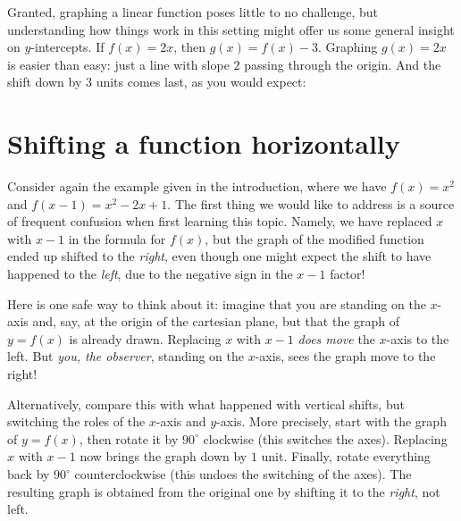 \documentclass{ximera}
\begin{document}
\begin{example}
\begin{enumerate}[label=\alph*.]
\begin{explanation}
      Granted, graphing a linear function poses little to no challenge, but understanding how things work in this setting might offer us some general insight on $y$-intercepts. If $f(x) = 2x$, then $g(x) = f(x)-3$. Graphing $g(x) = 2x$ is easier than easy: just a line with slope $2$ passing through the origin. And the shift down by $3$ units comes last, as you would expect:
            \begin{image}
      \end{image}
    \end{explanation}
  \end{enumerate}
\end{example}


\section{Shifting a function horizontally}

Consider again the example given in the introduction, where we have $f(x) = x^2$ and $f(x-1) = x^2-2x+1$. The first thing we would like to address is a source of frequent confusion when first learning this topic. Namely, we have replaced $x$ with $x-1$ in the formula for $f(x)$, but the graph of the modified function ended up shifted to the \emph{right}, even though one might expect the shift to have happened to the \emph{left}, due to the negative sign in the $x-1$ factor!

Here is one safe way to think about it: imagine that you are standing on the $x$-axis and, say, at the origin of the cartesian plane, but that the graph of $y=f(x)$ is already drawn. Replacing $x$ with $x-1$ \emph{does move} the $x$-axis to the left. But \emph{you, the observer}, standing on the $x$-axis, sees the graph move to the right!

Alternatively, compare this with what happened with vertical shifts, but switching the roles of the $x$-axis and $y$-axis. More precisely, start with the graph of $y=f(x)$, then rotate it by $90^\circ$ clockwise (this switches the axes). Replacing $x$ with $x-1$ now brings the graph down by $1$ unit. Finally, rotate everything back by $90^\circ$ counterclockwise (this undoes the switching of the axes). The resulting graph is obtained from the original one by shifting it to the \emph{right}, not left. 
\end{document}
